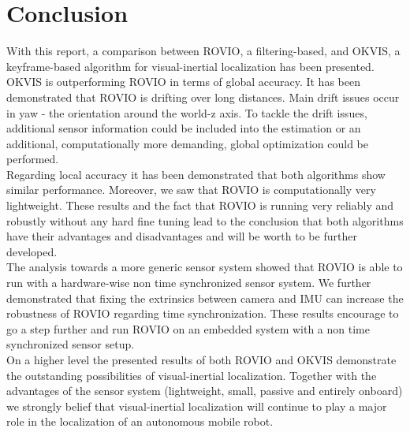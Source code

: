 \chapter{Conclusion}
\label{sec:conclusion}

With this report, a comparison between ROVIO, a filtering-based, and OKVIS, a keyframe-based algorithm for visual-inertial localization has been presented. OKVIS is outperforming ROVIO in terms of global accuracy. It has been demonstrated that ROVIO is drifting over long distances. Main drift issues occur in yaw - the orientation around the world-z axis. To tackle the drift issues, additional sensor information could be included into the estimation or an additional, computationally more demanding, global optimization could be performed. \\

Regarding local accuracy it has been demonstrated that both algorithms show similar performance. Moreover, we saw that ROVIO is computationally very lightweight. These results and the fact that ROVIO is running very reliably and robustly without any hard fine tuning lead to the conclusion that both algorithms have their advantages and disadvantages and will be worth to be further developed. \\

The analysis towards a more generic sensor system showed that ROVIO is able to run with a hardware-wise non time synchronized sensor system. We further demonstrated that fixing the extrinsics between camera and IMU can increase the robustness of ROVIO regarding time synchronization. These results encourage to go a step further and run ROVIO on an embedded system with a non time synchronized sensor setup. \\

On a higher level the presented results of both ROVIO and OKVIS demonstrate the outstanding possibilities of visual-inertial localization. Together with the advantages of the sensor system (lightweight, small, passive and entirely onboard) we strongly belief that visual-inertial localization will continue to play a major role in the localization of an autonomous mobile robot.

